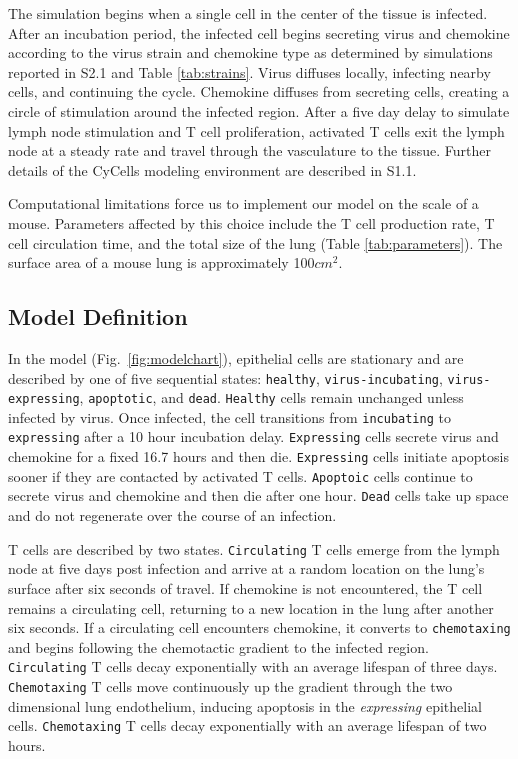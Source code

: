 \documentclass[10pt]{article}
\begin{document}
The simulation begins when a single cell in the center of the tissue is infected. After an incubation period, the infected cell begins secreting virus and chemokine according to the virus strain and chemokine type as determined by simulations reported in S2.1 and Table \ref{tab:strains}. Virus diffuses locally, infecting nearby cells, and continuing the cycle. Chemokine diffuses from secreting cells, creating a circle of stimulation around the infected region. After a five day delay to simulate lymph node stimulation and T cell proliferation, activated T cells exit the lymph node at a steady rate and travel through the vasculature to the tissue.  Further details of the CyCells modeling environment are described in S1.1.

Computational limitations force us to implement our model on the scale of a mouse.  Parameters affected by this choice include the T cell production rate, T cell circulation time, and the total size of the lung (Table \ref{tab:parameters}).  The surface area of a mouse lung is approximately 100$cm^2$.


\subsection*{Model Definition}

In the model (Fig.~\ref{fig:modelchart}), epithelial cells are stationary and are described by one of five sequential states: \texttt{healthy}, \texttt{virus-incubating}, \texttt{virus-expressing}, \texttt{apoptotic}, and \texttt{dead}. \texttt{Healthy} cells remain unchanged unless infected by virus. Once infected, the cell transitions from \texttt{incubating} to \texttt{expressing} after a 10 hour incubation delay. \texttt{Expressing} cells secrete virus and chemokine for a fixed 16.7 hours and then die. \texttt{Expressing} cells initiate apoptosis sooner if they are contacted by activated T cells. \texttt{Apoptoic} cells continue to secrete virus and chemokine and then die after one hour. \texttt{Dead} cells take up space and do not regenerate over the course of an infection.

T cells are described by two states. \texttt{Circulating} T cells emerge from the lymph node at five days post infection and arrive at a random location on the lung's surface after six seconds of travel.  If chemokine is not encountered, the T cell remains a circulating cell, returning to a new location in the lung after another six seconds.  If a circulating cell encounters chemokine, it converts to \texttt{chemotaxing} and begins following the chemotactic gradient to the infected region. \texttt{Circulating} T cells decay exponentially with an average lifespan of three days.  \texttt{Chemotaxing} T cells move continuously up the gradient through the two dimensional lung endothelium, inducing apoptosis in the \textit{expressing} epithelial cells. \texttt{Chemotaxing} T cells decay exponentially with an average lifespan of two hours.
\end{document}

